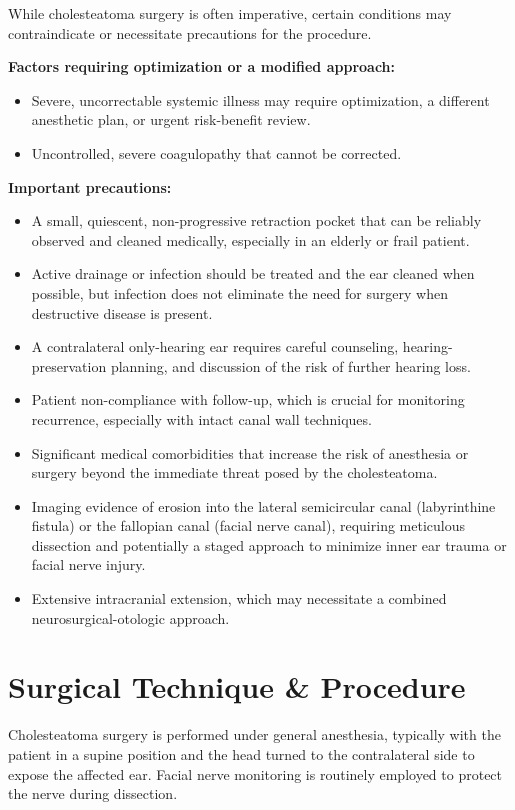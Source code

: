 While cholesteatoma surgery is often imperative, certain conditions may contraindicate or necessitate precautions for the procedure.

\textbf{Factors requiring optimization or a modified approach:}
\begin{itemize}
  \item Severe, uncorrectable systemic illness may require optimization, a different anesthetic plan, or urgent risk-benefit review.
  
  \item Uncontrolled, severe coagulopathy that cannot be corrected.
\end{itemize}

\textbf{Important precautions:}
\begin{itemize}
  \item A small, quiescent, non-progressive retraction pocket that can be reliably observed and cleaned medically, especially in an elderly or frail patient.
  
  \item Active drainage or infection should be treated and the ear cleaned when possible, but infection does not eliminate the need for surgery when destructive disease is present.
  
  \item A contralateral only-hearing ear requires careful counseling, hearing-preservation planning, and discussion of the risk of further hearing loss.
  
  \item Patient non-compliance with follow-up, which is crucial for monitoring recurrence, especially with intact canal wall techniques.
  
  \item Significant medical comorbidities that increase the risk of anesthesia or surgery beyond the immediate threat posed by the cholesteatoma.
  
  \item Imaging evidence of erosion into the lateral semicircular canal (labyrinthine fistula) or the fallopian canal (facial nerve canal), requiring meticulous dissection and potentially a staged approach to minimize inner ear trauma or facial nerve injury.
  
  \item Extensive intracranial extension, which may necessitate a combined neurosurgical-otologic approach.
\end{itemize}

\section*{Surgical Technique \& Procedure}
Cholesteatoma surgery is performed under general anesthesia, typically with the patient in a supine position and the head turned to the contralateral side to expose the affected ear. Facial nerve monitoring is routinely employed to protect the nerve during dissection.

